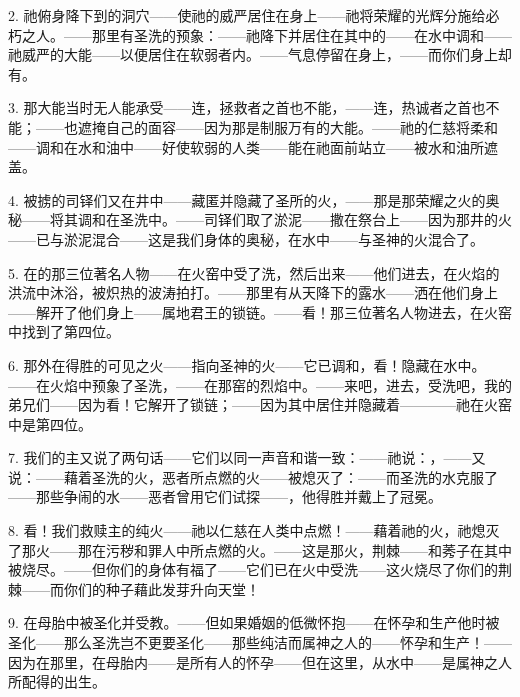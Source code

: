 2. 祂俯身降下到的洞穴——使祂的威严居住在身上——祂将荣耀的光辉分施给必朽之人。——那里有圣洗的预象：——祂降下并居住在其中的——在水中调和——祂威严的大能——以便居住在软弱者内。——气息停留在身上，——而你们身上却有。\par

3. 那大能当时无人能承受——连，拯救者之首也不能，——连，热诚者之首也不能；——也遮掩自己的面容——因为那是制服万有的大能。——祂的仁慈将柔和——调和在水和油中——好使软弱的人类——能在祂面前站立——被水和油所遮盖。\par

4. 被掳的司铎们又在井中——藏匿并隐藏了圣所的火，——那是那荣耀之火的奥秘——将其调和在圣洗中。——司铎们取了淤泥——撒在祭台上——因为那井的火——已与淤泥混合——这是我们身体的奥秘，在水中——与圣神的火混合了。\par

5. 在的那三位著名人物——在火窑中受了洗，然后出来——他们进去，在火焰的洪流中沐浴，被炽热的波涛拍打。——那里有从天降下的露水——洒在他们身上——解开了他们身上——属地君王的锁链。——看！那三位著名人物进去，在火窑中找到了第四位。\par

6. 那外在得胜的可见之火——指向圣神的火——它已调和，看！隐藏在水中。——在火焰中预象了圣洗，——在那窑的烈焰中。——来吧，进去，受洗吧，我的弟兄们——因为看！它解开了锁链；——因为其中居住并隐藏着————祂在火窑中是第四位。\par

7. 我们的主又说了两句话——它们以同一声音和谐一致：——祂说：，——又说：——藉着圣洗的火，恶者所点燃的火——被熄灭了：——而圣洗的水克服了——那些争闹的水——恶者曾用它们试探——，他得胜并戴上了冠冕。\par

8. 看！我们救赎主的纯火——祂以仁慈在人类中点燃！——藉着祂的火，祂熄灭了那火——那在污秽和罪人中所点燃的火。——这是那火，荆棘——和莠子在其中被烧尽。——但你们的身体有福了——它们已在火中受洗——这火烧尽了你们的荆棘——而你们的种子藉此发芽升向天堂！\par

9. 在母胎中被圣化并受教。——但如果婚姻的低微怀抱——在怀孕和生产他时被圣化——那么圣洗岂不更要圣化——那些纯洁而属神之人的——怀孕和生产！——因为在那里，在母胎内——是所有人的怀孕——但在这里，从水中——是属神之人所配得的出生。\par


